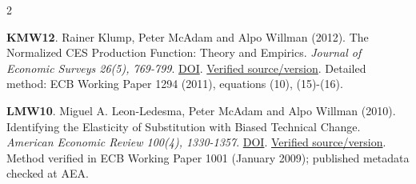 \documentclass[10pt,a4paper,landscape]{article}
\begin{document}
\begin{multicols}{2}
\begin{minipage}{\linewidth}\hypertarget{ref:KMW12}{}\textbf{KMW12}. Rainer Klump, Peter McAdam and Alpo Willman (2012). The Normalized CES Production Function: Theory and Empirics. \emph{Journal of Economic Surveys 26(5), 769-799}. \href{https://doi.org/10.1111/j.1467-6419.2012.00730.x}{DOI}. \href{https://www.ecb.europa.eu/pub/pdf/scpwps/ecbwp1294.pdf}{Verified source/version}. Detailed method: ECB Working Paper 1294 (2011), equations (10), (15)-(16).\end{minipage}\par
\begin{minipage}{\linewidth}\hypertarget{ref:LMW10}{}\textbf{LMW10}. Miguel A. Leon-Ledesma, Peter McAdam and Alpo Willman (2010). Identifying the Elasticity of Substitution with Biased Technical Change. \emph{American Economic Review 100(4), 1330-1357}. \href{https://doi.org/10.1257/aer.100.4.1330}{DOI}. \href{https://www.ecb.europa.eu/pub/pdf/scpwps/ecbwp1001.pdf}{Verified source/version}. Method verified in ECB Working Paper 1001 (January 2009); published metadata checked at AEA.\end{minipage}\par
\end{multicols}
\end{document}
